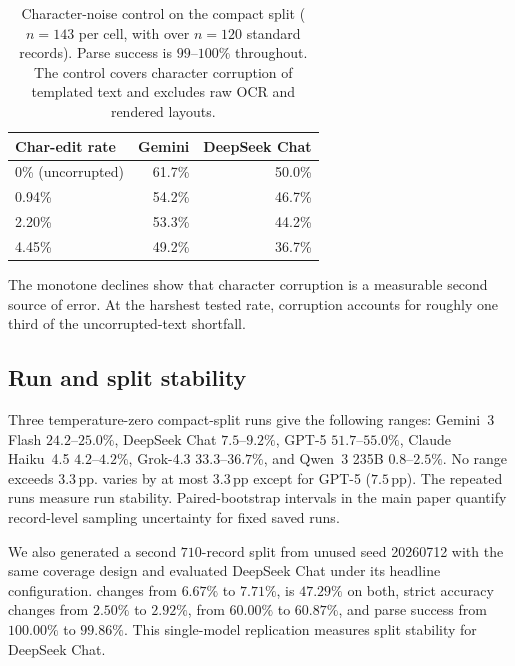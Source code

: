 \begin{table}[t]
\centering
\small
\setlength{\tabcolsep}{4pt}
\begin{tabular}{@{}lrr@{}}
\toprule
Char-edit rate & Gemini \bsrecon{} & \shortstack{DeepSeek Chat\\\bsrecon{}} \\
\midrule
0\% (uncorrupted) & 61.7\% & 50.0\% \\
0.94\% & 54.2\% & 46.7\% \\
2.20\% & 53.3\% & 44.2\% \\
4.45\% & 49.2\% & 36.7\% \\
\bottomrule
\end{tabular}
\caption{Character-noise control on the compact split ($n{=}143$ per cell, with \bsrecon{} over $n{=}120$ standard records). Parse success is $99$--$100\%$ throughout. The control covers character corruption of templated text and excludes raw OCR and rendered layouts.}
\label{tab:ocr-noise}
\end{table}

The monotone declines show that character corruption is a measurable second source of error. At the harshest tested rate, corruption accounts for roughly one third of the uncorrupted-text shortfall.

\subsection{Run and split stability}
\label{appx:stability-controls}

Three temperature-zero compact-split runs give the following \bsexact{} ranges: Gemini~3 Flash $24.2$--$25.0\%$, DeepSeek Chat $7.5$--$9.2\%$, GPT-5 $51.7$--$55.0\%$, Claude Haiku~4.5 $4.2$--$4.2\%$, Grok-4.3 $33.3$--$36.7\%$, and Qwen~3 235B $0.8$--$2.5\%$. No range exceeds $3.3$\,pp. \bsrecon{} varies by at most $3.3$\,pp except for GPT-5 ($7.5$\,pp). The repeated runs measure run stability. Paired-bootstrap intervals in the main paper quantify record-level sampling uncertainty for fixed saved runs.

We also generated a second $710$-record split from unused seed 20260712 with the same coverage design and evaluated DeepSeek Chat under its headline configuration. \bsexact{} changes from $6.67\%$ to $7.71\%$, \bsrecon{} is $47.29\%$ on both, strict accuracy changes from $2.50\%$ to $2.92\%$, \incCode{} from $60.00\%$ to $60.87\%$, and parse success from $100.00\%$ to $99.86\%$. This single-model replication measures split stability for DeepSeek Chat.


